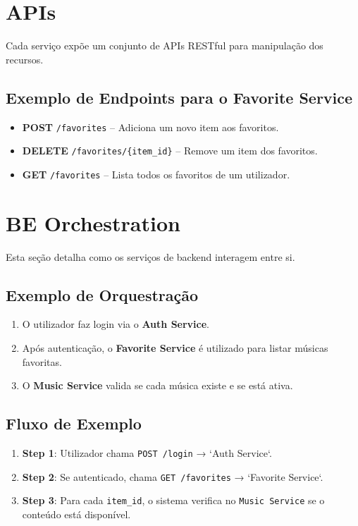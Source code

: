 \documentclass[a4paper,12pt]{article}
\begin{document}
\clearpage %

\section{APIs}
Cada serviço expõe um conjunto de APIs RESTful para manipulação dos recursos.

\subsection{Exemplo de Endpoints para o Favorite Service}
\begin{itemize}
    \item \textbf{POST} \texttt{/favorites} – Adiciona um novo item aos favoritos.
    \item \textbf{DELETE} \texttt{/favorites/\{item\_id\}} – Remove um item dos favoritos.
    \item \textbf{GET} \texttt{/favorites} – Lista todos os favoritos de um utilizador.
\end{itemize}

\clearpage %

\section{BE Orchestration}
Esta seção detalha como os serviços de backend interagem entre si.

\subsection{Exemplo de Orquestração}
\begin{enumerate}
    \item O utilizador faz login via o \textbf{Auth Service}.
    \item Após autenticação, o \textbf{Favorite Service} é utilizado para listar músicas favoritas.
    \item O \textbf{Music Service} valida se cada música existe e se está ativa.
\end{enumerate}

\subsection{Fluxo de Exemplo}
\begin{enumerate}
    \item \textbf{Step 1}: Utilizador chama \texttt{POST /login} → `Auth Service`.  
    \item \textbf{Step 2}: Se autenticado, chama \texttt{GET /favorites} → `Favorite Service`.  
    \item \textbf{Step 3}: Para cada \texttt{item\_id}, o sistema verifica no \texttt{Music Service} se o conteúdo está disponível.  
\end{enumerate}
\end{document}
